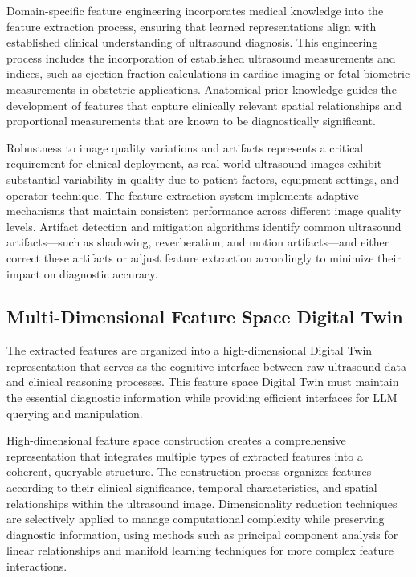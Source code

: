 Domain-specific feature engineering incorporates medical knowledge into the feature extraction process, ensuring that learned representations align with established clinical understanding of ultrasound diagnosis. This engineering process includes the incorporation of established ultrasound measurements and indices, such as ejection fraction calculations in cardiac imaging or fetal biometric measurements in obstetric applications. Anatomical prior knowledge guides the development of features that capture clinically relevant spatial relationships and proportional measurements that are known to be diagnostically significant.

Robustness to image quality variations and artifacts represents a critical requirement for clinical deployment, as real-world ultrasound images exhibit substantial variability in quality due to patient factors, equipment settings, and operator technique. The feature extraction system implements adaptive mechanisms that maintain consistent performance across different image quality levels. Artifact detection and mitigation algorithms identify common ultrasound artifacts—such as shadowing, reverberation, and motion artifacts—and either correct these artifacts or adjust feature extraction accordingly to minimize their impact on diagnostic accuracy.

\subsection{Multi-Dimensional Feature Space Digital Twin}

The extracted features are organized into a high-dimensional Digital Twin representation that serves as the cognitive interface between raw ultrasound data and clinical reasoning processes. This feature space Digital Twin must maintain the essential diagnostic information while providing efficient interfaces for LLM querying and manipulation.

High-dimensional feature space construction creates a comprehensive representation that integrates multiple types of extracted features into a coherent, queryable structure. The construction process organizes features according to their clinical significance, temporal characteristics, and spatial relationships within the ultrasound image. Dimensionality reduction techniques are selectively applied to manage computational complexity while preserving diagnostic information, using methods such as principal component analysis for linear relationships and manifold learning techniques for more complex feature interactions.

